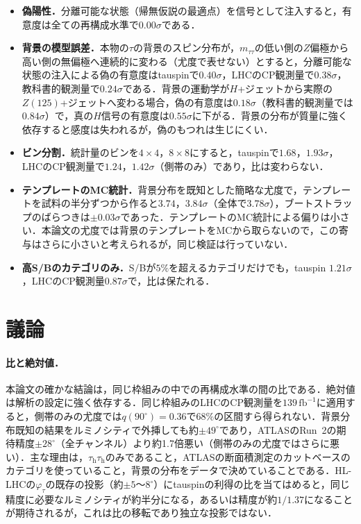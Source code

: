 \documentclass[paper=a4,fontsize=10pt,jafontsize=10pt,line_length=44zw,number_of_lines=46]{jlreq}
\newcommand{\tauh}{\tau_{\mathrm{h}}}
\newcommand{\fbinv}{\,\mathrm{fb}^{-1}}
\begin{document}
\begin{itemize}
  \item \textbf{偽陽性．}分離可能な状態（帰無仮説の最適点）を信号として注入すると，有意度は全ての再構成水準で$0.00\sigma$である．
  \item \textbf{背景の模型誤差．}本物の$\tau$の背景のスピン分布が，$m_{\tau\tau}$の低い側の$Z$偏極から高い側の無偏極へ連続的に変わる（尤度で表せない）とすると，分離可能な状態の注入による偽の有意度はtauspinで$0.40\sigma$，LHCのCP観測量で$0.38\sigma$，教科書的観測量で$0.24\sigma$である．背景の運動学が$H$+ジェットから実際の$Z(125)$+ジェットへ変わる場合，偽の有意度は$0.18\sigma$（教科書的観測量では$0.84\sigma$）で，真の$H$信号の有意度は$0.55\sigma$に下がる．背景の分布が質量に強く依存すると感度は失われるが，偽のもつれは生じにくい．
  \item \textbf{ビン分割．}統計量のビンを$4\times4$，$8\times8$にすると，tauspinで$1.68$，$1.93\sigma$，LHCのCP観測量で$1.24$，$1.42\sigma$（側帯のみ）であり，比は変わらない．
  \item \textbf{テンプレートのMC統計．}背景分布を既知とした簡略な尤度で，テンプレートを試料の半分ずつから作ると$3.74$，$3.84\sigma$（全体で$3.78\sigma$），ブートストラップのばらつきは$\pm0.03\sigma$であった．テンプレートのMC統計による偏りは小さい．本論文の尤度では背景のテンプレートをMCから取らないので，この寄与はさらに小さいと考えられるが，同じ検証は行っていない．
  \item \textbf{高S/Bのカテゴリのみ．}S/Bが$5\%$を超えるカテゴリだけでも，tauspin $1.21\sigma$，LHCのCP観測量$0.87\sigma$で，比は保たれる．
\end{itemize}

\section{議論}\label{sec:disc}

\paragraph{比と絶対値．}本論文の確かな結論は，同じ枠組みの中での再構成水準の間の比である．絶対値は解析の設定に強く依存する．同じ枠組みのLHCのCP観測量を$139\fbinv$に適用すると，側帯のみの尤度では$q(90^\circ)=0.36$で$68\%$の区間すら得られない．背景分布既知の結果をルミノシティで外挿しても約$\pm49^\circ$であり，ATLASのRun~2の期待精度$\pm28^\circ$（全チャンネル）より約1.7倍悪い（側帯のみの尤度ではさらに悪い）．主な理由は，$\tauh\tauh$のみであること，ATLASの断面積測定のカットベースのカテゴリを使っていること，背景の分布をデータで決めていることである．HL-LHCの$\varphi_\tau$の既存の投影（約$\pm5$〜$8^\circ$\cite{HiggsHLLHC}）にtauspinの利得の比を当てはめると，同じ精度に必要なルミノシティが約半分になる，あるいは精度が約$1/1.37$になることが期待されるが，これは比の移転であり独立な投影ではない．
\end{document}
